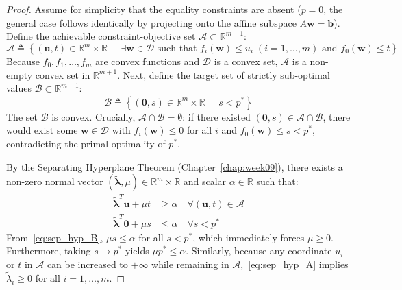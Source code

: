 \begin{proof}
Assume for simplicity that the equality constraints are absent ($p=0$, the general case follows identically by projecting onto the affine subspace $A\mathbf{w} = \mathbf{b}$). Define the achievable constraint-objective set $\mathcal{A} \subset \mathbb{R}^{m+1}$:
\begin{equation}
\mathcal{A} \triangleq \left\{ (\mathbf{u}, t) \in \mathbb{R}^m \times \mathbb{R} \;\middle|\; \exists \mathbf{w} \in \mathcal{D} \text{ such that } f_i(\mathbf{w}) \le u_i \; (i = 1, \dots, m) \text{ and } f_0(\mathbf{w}) \le t \right\}
\end{equation}
Because $f_0, f_1, \dots, f_m$ are convex functions and $\mathcal{D}$ is a convex set, $\mathcal{A}$ is a non-empty convex set in $\mathbb{R}^{m+1}$.
Next, define the target set of strictly sub-optimal values $\mathcal{B} \subset \mathbb{R}^{m+1}$:
\begin{equation}
\mathcal{B} \triangleq \left\{ (\mathbf{0}, s) \in \mathbb{R}^m \times \mathbb{R} \;\middle|\; s < p^* \right\}
\end{equation}
The set $\mathcal{B}$ is convex. Crucially, $\mathcal{A} \cap \mathcal{B} = \emptyset$: if there existed $(\mathbf{0}, s) \in \mathcal{A} \cap \mathcal{B}$, there would exist some $\mathbf{w} \in \mathcal{D}$ with $f_i(\mathbf{w}) \le 0$ for all $i$ and $f_0(\mathbf{w}) \le s < p^*$, contradicting the primal optimality of $p^*$.

By the Separating Hyperplane Theorem (Chapter~\ref{chap:week09}), there exists a non-zero normal vector $(\tilde{\boldsymbol{\lambda}}, \mu) \in \mathbb{R}^m \times \mathbb{R}$ and scalar $\alpha \in \mathbb{R}$ such that:
\begin{align}
\tilde{\boldsymbol{\lambda}}^T \mathbf{u} + \mu t &\ge \alpha \quad \forall (\mathbf{u}, t) \in \mathcal{A} \label{eq:sep_hyp_A} \\
\tilde{\boldsymbol{\lambda}}^T \mathbf{0} + \mu s &\le \alpha \quad \forall s < p^* \label{eq:sep_hyp_B}
\end{align}
From~\eqref{eq:sep_hyp_B}, $\mu s \le \alpha$ for all $s < p^*$, which immediately forces $\mu \ge 0$. Furthermore, taking $s \to p^*$ yields $\mu p^* \le \alpha$.
Similarly, because any coordinate $u_i$ or $t$ in $\mathcal{A}$ can be increased to $+\infty$ while remaining in $\mathcal{A}$,~\eqref{eq:sep_hyp_A} implies $\tilde{\lambda}_i \ge 0$ for all $i = 1, \dots, m$.


\end{proof}
